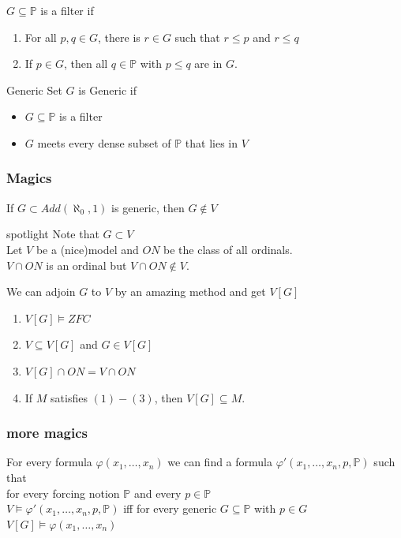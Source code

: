 \documentclass{beamer}
\begin{document}
\begin{frame}

\begin{definition}
$G \subseteq \mathbb{P}$ is a filter if
\begin{enumerate}
\item For all $p, q \in G$, there is $r \in G$ such that $r \leq p$ and $r \leq q$
\item  If $p \in G$, then all $q \in \mathbb{P}$ with $p \leq q$ are in $G$.
\end{enumerate}
\end{definition}
\pause
\begin{block}{Generic Set}
$G$ is Generic if
\begin{itemize}
	\item $G \subseteq \mathbb{P}$ is a filter
	\item $G$ meets every dense subset of $\mathbb{P}$ that lies in $V$
\end{itemize}
\end{block}
\end{frame}
\begin{frame}
\frametitle{Magics}
\begin{theorem}
If $G \subset Add(\aleph_0, 1)$ is generic, then $G \notin V$ 
\end{theorem}
\pause
\begin{block}{spotlight}
Note that $G \subset V$\\
Let $V$ be a (nice)model and $ON$ be the class of all ordinals.\\
$V \cap ON$ is an ordinal but $V \cap ON \notin V$.
\end{block}
\pause
We can adjoin $G$ to $V$ by an amazing method and get $V[G]$
\begin{enumerate}
\item $V[G] \models ZFC$
\item $V \subseteq V[G]$ and $G\in V[G]$
\item $V[G] \cap ON=V \cap ON$
\item If $M$ satisfies $(1)-(3)$, then $V[G] \subseteq M$.
\end{enumerate}
\end{frame}
\begin{frame}
\frametitle{more magics}
\begin{theorem}
For every formula $\varphi(x_1, \dots, x_n)$ we can find a formula $\varphi'(x_1, \dots, x_n, p, \mathbb{P})$ such that\\
for every forcing notion $\mathbb{P}$ and every $p \in \mathbb{P}$\\
$V \models \varphi'(x_1, \dots, x_n,p, \mathbb{P})$ iff for every generic $G \subseteq \mathbb{P}$ with $p \in G$\\
$V[G] \models \varphi(x_1, \dots, x_n)$
\end{theorem}
\end{frame}
\end{document}
